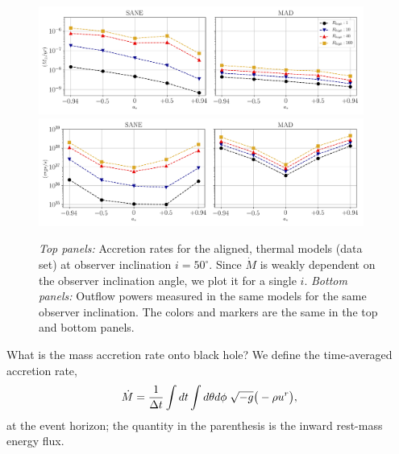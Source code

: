 \begin{figure}
\centering
\includegraphics[width=0.95\textwidth,trim=0 1.49cm 0 0,clip]{figures/illinoisv3_average_mdot.png}
\includegraphics[width=0.95\textwidth,trim=0 0 0 0.7cm,clip]{figures/illinoisv3_average_outflow_power.png}
\caption{{\it Top panels:} Accretion rates for the aligned, thermal models (\kharma data set) at observer inclination $i=50^{\circ}$. Since $\dot{M}$ is weakly dependent on the observer inclination angle, we plot it for a single $i$. {\it Bottom panels:} Outflow powers measured in the same models for the same observer inclination. The colors and markers are the same in the top and bottom panels.}
\label{fig:accretion_illinois_thermal}
\end{figure}

What is the mass accretion rate onto \sgra black hole?
We define the time-averaged accretion rate,
\begin{equation}
    \dot{M} = \frac{1}{\Delta t}\int dt\int d\theta d\phi\hspace{0.1cm}\sqrt{-g}\big(-\rho u^{r}\big),
\end{equation}
at the event horizon; the quantity in the parenthesis is the inward rest-mass energy flux.

